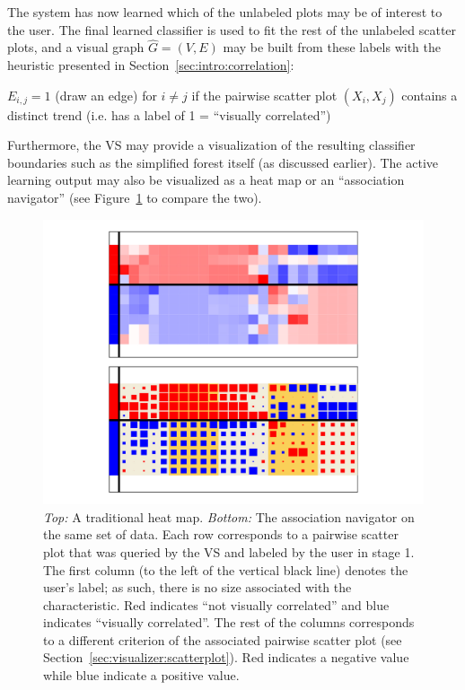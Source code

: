 The system has now learned which of the unlabeled plots 
may be of interest to the user. The final learned classifier is used to fit the 
rest of the unlabeled scatter plots, and a visual graph 
$\hat{G}=(V,E)$ 
may be built from these labels with the heuristic presented in 
Section~\ref{sec:intro:correlation}:

\begin{algorithm}
	$E_{i,j} = 1$ (draw an edge) for $i\neq j$ if the pairwise scatter plot 
	$(X_i,X_j)$ contains a distinct trend (i.e. has a label of 1 = ``visually 
	correlated'')
\end{algorithm}

Furthermore, the VS may provide a visualization of the resulting classifier 
boundaries such as the simplified forest itself (as discussed earlier). The 
active learning output may also be visualized as a heat map or an ``association 
navigator'' (see 
Figure~\ref{fig:visualizer:heatmap} to compare the two). 

\tablespacing
\begin{figure}[H]
	\begin{center}
		\includegraphics[width=1\linewidth]{ch-visualizer/figures/heatmap}
		\caption[Heat map versus association navigator]{\textit{Top:} A 
		traditional heat map. \textit{Bottom:} The association navigator on the 
		same set of data. 
		Each row corresponds to a pairwise scatter plot that was queried by the 
		VS and labeled by the user in 
		stage 1. The first column (to the left of the vertical black line) 
		denotes the user's label; as such, there is no size associated with the 
		characteristic. Red indicates ``not visually correlated'' 
		and blue indicates ``visually correlated''. The rest of the columns 
		corresponds to a different criterion of the associated pairwise 
		scatter plot (see Section~\ref{sec:visualizer:scatterplot}). Red 
		indicates a negative value while blue indicate a positive value. 		
		}
		\label{fig:visualizer:heatmap}
	\end{center}
\end{figure}
\bodyspacing


